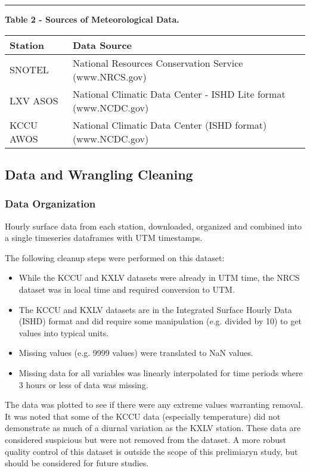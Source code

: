 \documentclass[11pt]{article}
\providecommand{\tightlist}{%
      \setlength{\itemsep}{0pt}\setlength{\parskip}{0pt}}
\begin{document}
\begin{center}\rule{0.5\linewidth}{\linethickness}\end{center}

\textbf{Table 2 - Sources of Meteorological Data.}

\begin{longtable}[]{@{}ll@{}}
\toprule
Station & Data Source\tabularnewline
\midrule
\endhead
SNOTEL & National Resources Conservation Service
(www.NRCS.gov)\tabularnewline
LXV ASOS & National Climatic Data Center - ISHD Lite format
(www.NCDC.gov)\tabularnewline
KCCU AWOS & National Climatic Data Center (ISHD format)
(www.NCDC.gov)\tabularnewline
\bottomrule
\end{longtable}

\subsection{Data and Wrangling
Cleaning}\label{data-and-wrangling-cleaning}

\subsubsection{Data Organization}\label{data-organization}

Hourly surface data from each station, downloaded, organized and
combined into a single timeseries dataframes with UTM timestamps.

The following cleanup steps were performed on this dataset:

\begin{itemize}
\tightlist
\item
  While the KCCU and KXLV datasets were already in UTM time, the NRCS
  dataset was in local time and required conversion to UTM.\\
\item
  The KCCU and KXLV datasets are in the Integrated Surface Hourly Data
  (ISHD) format and did require some manipulation (e.g. divided by 10)
  to get values into typical units.
\item
  Missing values (e.g. 9999 values) were translated to NaN values.
\item
  Missing data for all variables was linearly interpolated for time
  periods where 3 hours or less of data was missing.
\end{itemize}

The data was plotted to see if there were any extreme values warranting
removal. It was noted that some of the KCCU data (especially
temperature) did not demonstrate as much of a diurnal variation as the
KXLV station. These data are considered suspicious but were not removed
from the dataset. A more robust quality control of this dataset is
outside the scope of this prelimiaryn study, but should be considered
for future studies.
\end{document}
